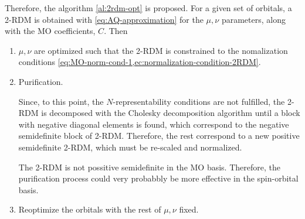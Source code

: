 Therefore, the algorithm \cref{al:2rdm-opt} is proposed.
For a given set of orbitals, a 2-RDM is obtained with \cref{eq:AQ-approximation}
for the $\mu, \nu$ parameters, along with the MO coefficients, $C$.
Then
\begin{enumerate}
    \item $\mu, \nu$ are optimized such that the 2-RDM is constrained
        to the nomalization conditions \cref{eq:MO-norm-cond-1,ec:normalization-condition-2RDM}.

    \item Purification.

        Since, to this point, the $N$-representability conditions are not
        fulfilled, the 2-RDM is decomposed with the Cholesky decomposition
        algorithm until a block with negative diagonal elements is found,
        which correspond to the negative semidefinite block of 2-RDM.
        Therefore, the rest correspond to a new positive semidefinite 2-RDM,
        which must be re-scaled and normalized.

        \begin{comentario}
        The 2-RDM is not possitive semidefinite in the MO basis.
        Therefore, the purification process could very probabbly be more
        effective in the spin-orbital basis.
        \end{comentario}

    \item Reoptimize the orbitals with the rest of $\mu, \nu$ fixed.
\end{enumerate}

